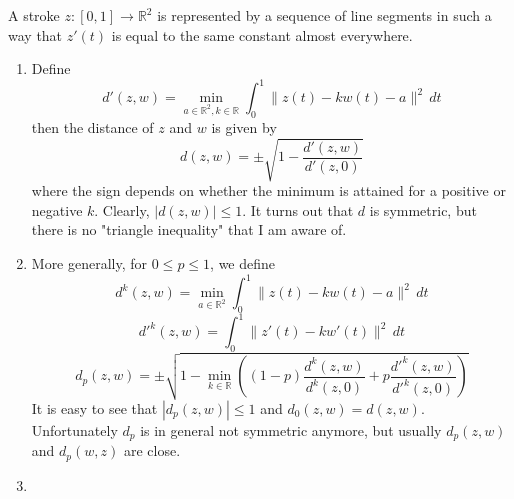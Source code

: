 \documentclass{article}
\newcommand{\R}{\mathbb{R}}
\begin{document}
A stroke $z: [0,1] \rightarrow \R^2$ is represented by a sequence of line
segments in such a way that $z'(t)$ is equal to the same constant almost
everywhere.  
\begin{enumerate}
\item
Define
\[ d'(z,w) = \min_{a \in \R^2, k \in \R} \int_0^1 \|z(t) - k w(t) - a\|^2 \, dt \]
then the distance of $z$ and $w$ is given by
\[ d(z,w) = \pm \sqrt{1-\frac{d'(z,w)}{d'(z,0)}} \]
where the sign depends on whether the minimum is attained for a positive or
negative $k$.  Clearly, $|d(z,w)| \leq 1$.  It turns out that $d$ is symmetric,
but there is no "triangle inequality" that I am aware of.

\item
More generally, for $0 \leq p \leq 1$, we define
\[ d^k(z, w) = \min_{a \in \R^2} \int_0^1 \|z(t) - k w(t) - a\|^2 \, dt\]
\[ d'^k(z, w) = \int_0^1 \|z'(t) - k w'(t)\|^2 \, dt\]
\[ d_p(z, w) = \pm \sqrt{1 - \min_{k \in \R}\left( (1-p)\frac{d^k(z,w)}{d^k(z,0)} + p\frac{d'^k(z,w)}{d'^k(z,0)} \right)} \]
It is easy to see that $|d_p(z,w)| \leq 1$ and $d_0(z,w) = d(z,w)$.
Unfortunately $d_p$ is in general not symmetric anymore, but usually
$d_p(z,w)$ and $d_p(w,z)$ are close.

\item
\end{enumerate}
\end{document}
